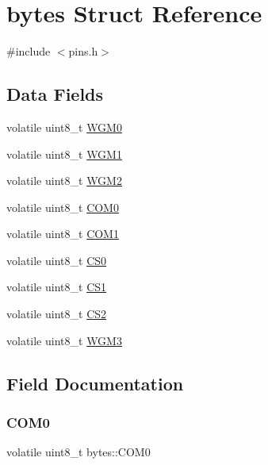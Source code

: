 \hypertarget{structbytes}{}\section{bytes Struct Reference}
\label{structbytes}


{\ttfamily \#include $<$pins.\+h$>$}

\subsection*{Data Fields}
\begin{DoxyCompactItemize}
\item 
volatile uint8\+\_\+t \mbox{\hyperlink{structbytes_a69a3e427eeac275f14818644d6d806fb}{W\+G\+M0}}
\item 
volatile uint8\+\_\+t \mbox{\hyperlink{structbytes_af1e463676e0734974e6d8aa648e40b74}{W\+G\+M1}}
\item 
volatile uint8\+\_\+t \mbox{\hyperlink{structbytes_a89629be7fefa4977a3caa8f221b91054}{W\+G\+M2}}
\item 
volatile uint8\+\_\+t \mbox{\hyperlink{structbytes_a5f42fc6762a8162a52f073984fa74475}{C\+O\+M0}}
\item 
volatile uint8\+\_\+t \mbox{\hyperlink{structbytes_a1be49f4571e2a14a90ea0e9b8dd71077}{C\+O\+M1}}
\item 
volatile uint8\+\_\+t \mbox{\hyperlink{structbytes_aefb315f54dda666e96e5362f083e0a09}{C\+S0}}
\item 
volatile uint8\+\_\+t \mbox{\hyperlink{structbytes_a7ce7046f62128725893863cf6c815c80}{C\+S1}}
\item 
volatile uint8\+\_\+t \mbox{\hyperlink{structbytes_a7f68d701243233c6136cc42a74a9139a}{C\+S2}}
\item 
volatile uint8\+\_\+t \mbox{\hyperlink{structbytes_a47af88f959a9d6186d912858a44044dc}{W\+G\+M3}}
\end{DoxyCompactItemize}


\subsection{Field Documentation}
\mbox{\label{structbytes_a5f42fc6762a8162a52f073984fa74475}} 
\subsubsection{\texorpdfstring{C\+O\+M0}{COM0}}
{\footnotesize\ttfamily volatile uint8\+\_\+t bytes\+::\+C\+O\+M0}

